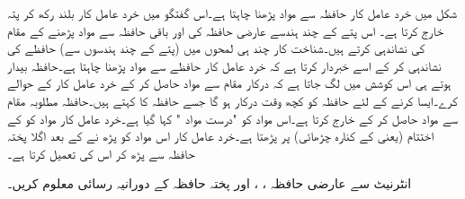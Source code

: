 شکل    میں خرد عامل کار حافظہ سے مواد پڑھنا چاہتا ہے۔اس گفتگو میں خرد عامل کار  بلند رکھ کر پتہ خارج کرتا ہے۔ اس  پتے کے چند ہندسے عارضی حافظہ کی اور باقی حافظہ سے مواد پڑھنے کے مقام کی نشاندہی کرتے ہیں۔شناخت کار چند ہی لمحوں میں (پتے کے چند ہندسوں سے) حافظے کی نشاندہی کر کے اسے خبردار کرتا ہے کہ خرد عامل کار حافظے سے مواد پڑھنا چاہتا ہے۔حافظہ بیدار ہوتے ہی اس کوشش میں لگ جاتا ہے کہ درکار مقام سے مواد حاصل کر کے خرد عامل کار کے حوالے کرے۔ایسا کرنے کے لئے حافظہ کو کچھ وقت درکار ہو گا جسے حافظہ کا  کہتے ہیں۔حافظہ مطلوبہ مقام سے مواد حاصل کر کے خارج کرتا ہے۔اس مواد کو "درست مواد " کہا گیا ہے۔خرد عامل کار مواد کو  کے اختتام  (یعنی  کے کنارہ چڑھائی)     پر پڑھتا ہے۔خرد عامل کار اس مواد کو پڑھ نے کے بعد  اگلا   پختہ حافظہ سے پڑھ کر   اس کی تعمیل کرتا ہے۔

انٹرنیٹ سے عارضی حافظہ  ، ،  اور پختہ حافظہ    کے دورانیہ رسائی معلوم  کریں۔

